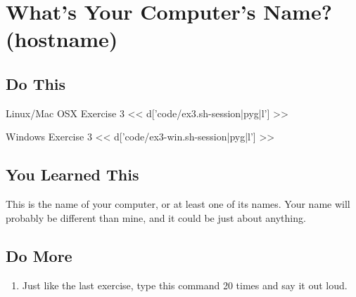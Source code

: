 \chapter{What's Your Computer's Name? (hostname)}

\section{Do This}

\begin{code}{Linux/Mac OSX Exercise 3}
<< d['code/ex3.sh-session|pyg|l'] >>
\end{code}

\begin{code}{Windows Exercise 3}
<< d['code/ex3-win.sh-session|pyg|l'] >>
\end{code}

\section{You Learned This}

This is the name of your computer, or at least one of its names. Your 
name will probably be different than mine, and it could be just about anything.

\section{Do More}

\begin{enumerate}
\item Just like the last exercise, type this command 20 times and say it out loud.
\end{enumerate}

